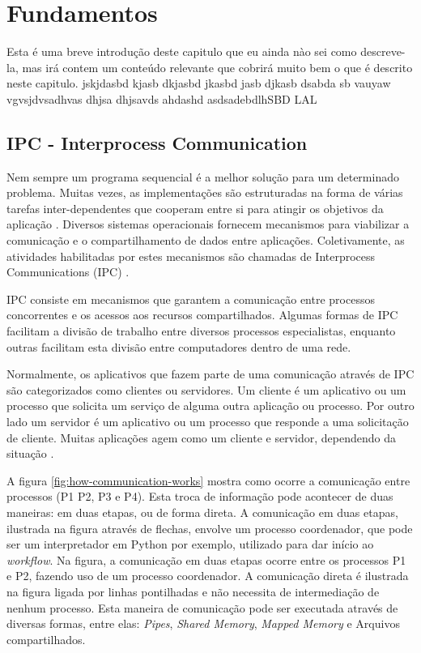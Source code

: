 \chapter[Fundamentos]{Fundamentos}

Esta é uma breve introdução deste capitulo que eu ainda nào sei como descreve-la, mas irá contem um conteúdo relevante que cobrirá muito bem o que é descrito neste capitulo. jskjdasbd kjasb dkjasbd jkasbd jasb djkasb dsabda sb vauyaw vgvsjdvsadhvas dhjsa dhjsavds ahdashd asdsadebdlhSBD LAL


\section{IPC - Interprocess Communication}\label{sec:ipc}

Nem sempre um programa sequencial é a melhor solução para um determinado problema. Muitas vezes, as implementações são estruturadas na forma de várias tarefas inter-dependentes que cooperam entre si para atingir os objetivos da aplicação \cite{sistemas-op-mazierro}. Diversos sistemas operacionais fornecem mecanismos para viabilizar a comunicação e o compartilhamento de dados entre aplicações. Coletivamente, as atividades habilitadas por estes mecanismos são chamadas de Interprocess Communications (IPC) \cite{microsoft-ipc}.

IPC consiste em mecanismos que garantem a comunicação entre processos concorrentes e os acessos aos recursos compartilhados. Algumas formas de IPC facilitam a divisão de trabalho entre diversos processos especialistas, enquanto outras facilitam esta divisão entre computadores dentro de uma rede.

Normalmente, os aplicativos que fazem parte de uma comunicação através de IPC são categorizados como clientes ou servidores. Um cliente é um aplicativo ou um processo que solicita um serviço de alguma outra aplicação ou processo. Por outro lado um servidor é um aplicativo ou um processo que responde a uma solicitação de cliente. Muitas aplicações agem como um cliente e servidor, dependendo da situação \cite{microsoft-ipc}.

A figura \ref{fig:how-communication-works} mostra como ocorre a comunicação entre processos (P1 P2, P3 e P4). Esta troca de informação pode acontecer de duas maneiras: em duas etapas, ou de forma direta. A comunicação em duas etapas, ilustrada na figura através de flechas, envolve um processo coordenador, que pode ser um interpretador em Python por exemplo, utilizado para dar início ao \textit{workflow}. Na figura, a comunicação em duas etapas ocorre entre os processos P1 e P2, fazendo uso de um processo coordenador. A comunicação direta é ilustrada na figura ligada por linhas pontilhadas e não necessita de intermediação de nenhum processo. Esta maneira de comunicação pode ser executada através de diversas formas, entre elas: \textit{Pipes}, \textit{Shared Memory}, \textit{Mapped Memory} e Arquivos compartilhados.

